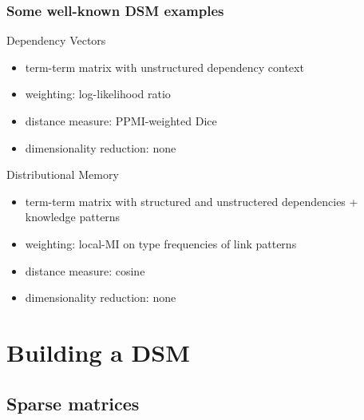 \documentclass[t]{beamer} %
\begin{document}
\begin{frame}
  \frametitle{Some well-known DSM examples}

  \ungap
  \begin{block}{Dependency Vectors \citep{Pado:Lapata:07}}
    \begin{itemize}
    \item term-term matrix with unstructured dependency context
    \item weighting: log-likelihood ratio
    \item distance measure: PPMI-weighted Dice \citep{Lin:98b}
    \item dimensionality reduction: none
    \end{itemize}
  \end{block}
  
  \pause
  \begin{block} {Distributional Memory \citep{Baroni:Lenci:10}}
    \begin{itemize}
    \item term-term matrix with structured and unstructered dependencies + knowledge patterns
    \item weighting: local-MI on type frequencies of link patterns
    \item distance measure: cosine
    \item dimensionality reduction: none
    \end{itemize}
  \end{block}
\end{frame}

\section{Building a DSM}

\subsection{Sparse matrices}
\end{document}
